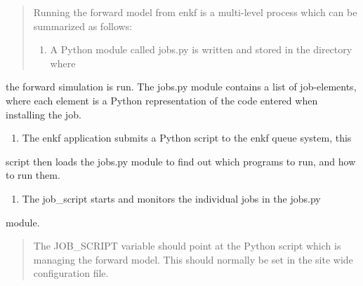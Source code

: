 \documentclass[a4paper,10pt,english]{sphinxmanual}
\begin{document}
\begin{sphinxShadowBox}
\begin{quote}

Running the forward model from enkf is a multi-level process which can be
summarized as follows:
\begin{enumerate}
\item {} 
A Python module called jobs.py is written and stored in the directory where

\end{enumerate}
\end{quote}

the forward simulation is run. The jobs.py module contains a list of
job-elements, where each element is a Python representation of the code
entered when installing the job.
\begin{enumerate}
\item {} 
The enkf application submits a Python script to the enkf queue system, this

\end{enumerate}

script then loads the jobs.py module to find out which programs to run, and
how to run them.
\begin{enumerate}
\item {} 
The job\_script starts and monitors the individual jobs in the jobs.py

\end{enumerate}

module.
\begin{quote}

The JOB\_SCRIPT variable should point at the Python script which is managing
the forward model. This should normally be set in the site wide configuration
file.
\end{quote}
\end{sphinxShadowBox}
\label{\detokenize{keywords/index:queue-system}}
\end{document}
